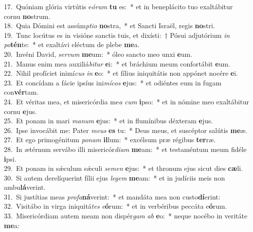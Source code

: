 {17.~}Quóniam glória virtútis e\textit{ó}\textit{rum} \textbf{tu} es:~* et in beneplácito tuo exaltábitur cornu \textbf{no}strum.\\
{18.~}Quia Dómini est assúm\textit{pti}\textit{o} \textbf{no}stra,~* et Sancti Israël, regis \textbf{no}stri.\\
{19.~}Tunc locútus es in visióne sanctis tuis, et dixísti:~† Pósui adjutórium \textit{in} \textit{po}\textbf{tén}te:~* et exaltávi eléctum de plebe \textbf{me}a.\\
{20.~}Invéni David, \textit{ser}\textit{vum} \textbf{me}um:~* óleo sancto meo unxi \textbf{e}um.\\
{21.~}Manus enim mea auxiliá\textit{bi}\textit{tur} \textbf{e}i:~* et bráchium meum confortábit \textbf{e}um.\\
{22.~}Nihil profíciet inimí\textit{cus} \textit{in} \textbf{e}o:~* et fílius iniquitátis non appónet nocére \textbf{e}i.\\
{23.~}Et concídam a fácie ipsíus ini\textit{mí}\textit{cos} \textbf{e}jus:~* et odiéntes eum in fugam con\textbf{vér}tam.\\
{24.~}Et véritas mea, et misericórdia me\textit{a} \textit{cum} \textbf{i}pso:~* et in nómine meo exaltábitur cornu \textbf{e}jus.\\
{25.~}Et ponam in mari \textit{ma}\textit{num} \textbf{e}jus:~* et in flumínibus déxteram \textbf{e}jus.\\
{26.~}Ipse invocábit me: Pater \textit{me}\textit{us} \textbf{es} tu:~* Deus meus, et suscéptor salútis \textbf{me}æ.\\
{27.~}Et ego primogénitum \textit{po}\textit{nam} \textbf{il}lum:~* excélsum præ régibus \textbf{ter}ræ.\\
{28.~}In ætérnum servábo illi misericór\textit{di}\textit{am} \textbf{me}am:~* et testaméntum meum fidéle \textbf{i}psi.\\
{29.~}Et ponam in sǽculum sǽculi \textit{se}\textit{men} \textbf{e}jus:~* et thronum ejus sicut dies \textbf{cæ}li.\\
{30.~}Si autem derelíquerint fílii ejus \textit{le}\textit{gem} \textbf{me}am:~* et in judíciis meis non ambu\textbf{lá}verint.\\
{31.~}Si justítias meas \textit{pro}\textit{fa}\textbf{ná}verint:~* et mandáta mea non custo\textbf{dí}erint:\\
{32.~}Visitábo in virga iniquitá\textit{tes} \textit{e}\textbf{ó}rum:~* et in verbéribus peccáta e\textbf{ó}rum.\\
{33.~}Misericórdiam autem meam non dispér\textit{gam} \textit{ab} \textbf{e}o:~* neque nocébo in veritáte \textbf{me}a:\\
